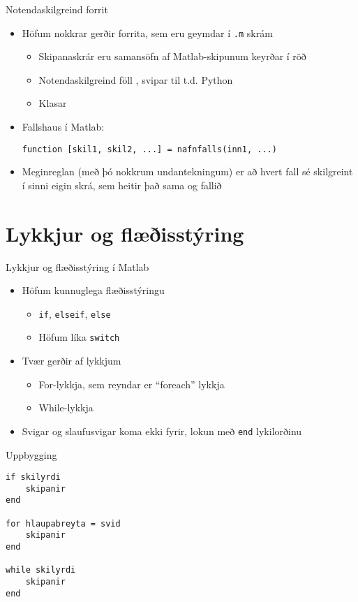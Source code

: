\documentclass{beamer}
\begin{document}
\begin{frame}[fragile]{Notendaskilgreind forrit}
    \begin{itemize}
        \item Höfum nokkrar gerðir forrita, sem eru geymdar í \texttt{.m} skrám
        \begin{itemize}
            \item Skipanaskrár  eru samansöfn af Matlab-skipunum keyrðar í röð
            \item Notendaskilgreind föll , svipar til t.d. Python
            \item Klasar
        \end{itemize}
        \item Fallshaus í Matlab:

        \begin{verbatim}
function [skil1, skil2, ...] = nafnfalls(inn1, ...)
        \end{verbatim}

        \item Meginreglan (með þó nokkrum undantekningum) er að hvert fall sé skilgreint í sinni eigin skrá, sem heitir það sama og fallið
    \end{itemize}
\end{frame}

\section{Lykkjur og flæðisstýring}

\begin{frame}{Lykkjur og flæðisstýring í Matlab}
    \begin{itemize}
        \item Höfum kunnuglega flæðisstýringu
        \begin{itemize}
            \item \texttt{if}, \texttt{elseif}, \texttt{else}
            \item Höfum líka \texttt{switch}
        \end{itemize}
        \item Tvær gerðir af lykkjum
        \begin{itemize}
            \item For-lykkja, sem reyndar er ``foreach'' lykkja
            \item While-lykkja
        \end{itemize}
        \item Svigar og slaufusvigar koma ekki fyrir, lokun með \texttt{end} lykilorðinu
    \end{itemize}
\end{frame}

\begin{frame}[fragile]{Uppbygging}
\begin{verbatim}
if skilyrdi
    skipanir
end

for hlaupabreyta = svid
    skipanir
end

while skilyrdi
    skipanir
end
\end{verbatim}
\end{frame}
\end{document}
